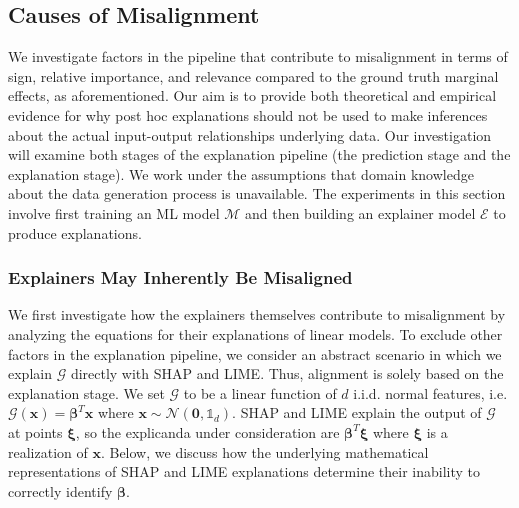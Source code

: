 \documentclass[12pt]{article}  %
\begin{document}
  
\vspace{-3mm}  \subsection{Causes of Misalignment}
    \label{sec:causes_of_misalignment}\vspace{-3mm}
    We investigate factors in the pipeline that contribute to misalignment in terms of sign, relative importance, and relevance compared to the ground truth marginal effects, as aforementioned. Our aim is to provide both theoretical and empirical evidence for why post hoc explanations should not be used to make inferences about the actual input-output relationships underlying data. Our investigation will examine both stages of the explanation pipeline (the prediction stage and the explanation stage). %
    We work under the assumptions that domain knowledge about the data generation process is unavailable. The experiments in this section involve first training an ML model $\mathcal{M}$ and then building an explainer model $\mathcal{E}$ to produce explanations. %
    


  \subsubsection{Explainers May Inherently Be Misaligned}
  \label{sec:theoretical_considerations}
  We first investigate how the explainers themselves contribute to misalignment by analyzing the equations for their explanations of linear models. To exclude other factors in the explanation pipeline, we consider an abstract scenario in which we explain $\mathcal{G}$ directly with SHAP and LIME. Thus, alignment is solely based on the explanation stage. We set $\mathcal{G}$ to be a linear function of $d$ i.i.d. normal features, i.e. $\mathcal{G}(\mathbf{x}) = \boldsymbol{\beta}^T \mathbf{x}$ where $\mathbf{x} \sim \mathcal{N}(\mathbf{0},\mathds{1}_d)$. SHAP and LIME explain the output of $\mathcal{G}$ at points $\boldsymbol{\xi}$, so the explicanda under consideration are $\boldsymbol{\beta}^T \boldsymbol{\xi}$ where $\boldsymbol{\xi}$ is a realization of $\mathbf{x}$. Below, we discuss how the underlying mathematical representations of SHAP and LIME explanations determine their inability to correctly identify $\boldsymbol{\beta}$. 
\end{document}
